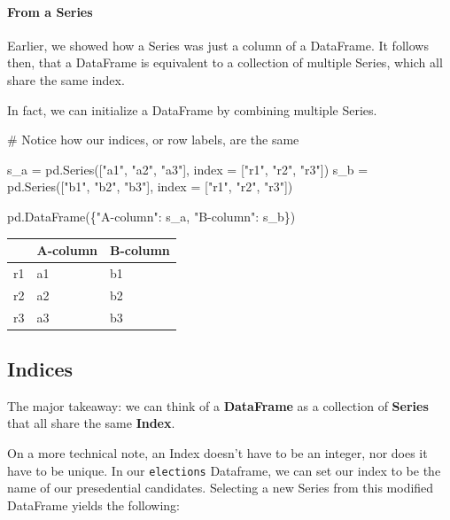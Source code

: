 \documentclass[
  letterpaper,
  DIV=11,
  numbers=noendperiod]{scrreprt}
\let\oldparagraph\paragraph
\renewcommand{\paragraph}[1]{\oldparagraph{#1}\mbox{}}
\newenvironment{Shaded}{\begin{snugshade}}{\end{snugshade}}
\newcommand{\CommentTok}[1]{\textcolor[rgb]{0.37,0.37,0.37}{#1}}
\newcommand{\NormalTok}[1]{\textcolor[rgb]{0.00,0.23,0.31}{#1}}
\newcommand{\OperatorTok}[1]{\textcolor[rgb]{0.37,0.37,0.37}{#1}}
\newcommand{\StringTok}[1]{\textcolor[rgb]{0.13,0.47,0.30}{#1}}
\begin{document}
\hypertarget{from-a-series}{%
\paragraph{From a Series}\label{from-a-series}}

Earlier, we showed how a Series was just a column of a DataFrame. It
follows then, that a DataFrame is equivalent to a collection of multiple
Series, which all share the same index.

In fact, we can initialize a DataFrame by combining multiple Series.

\begin{Shaded}
\begin{Highlighting}[]
\CommentTok{\# Notice how our indices, or row labels, are the same}

\NormalTok{s\_a }\OperatorTok{=}\NormalTok{ pd.Series([}\StringTok{"a1"}\NormalTok{, }\StringTok{"a2"}\NormalTok{, }\StringTok{"a3"}\NormalTok{], index }\OperatorTok{=}\NormalTok{ [}\StringTok{"r1"}\NormalTok{, }\StringTok{"r2"}\NormalTok{, }\StringTok{"r3"}\NormalTok{])}
\NormalTok{s\_b }\OperatorTok{=}\NormalTok{ pd.Series([}\StringTok{"b1"}\NormalTok{, }\StringTok{"b2"}\NormalTok{, }\StringTok{"b3"}\NormalTok{], index }\OperatorTok{=}\NormalTok{ [}\StringTok{"r1"}\NormalTok{, }\StringTok{"r2"}\NormalTok{, }\StringTok{"r3"}\NormalTok{])}

\NormalTok{pd.DataFrame(\{}\StringTok{"A{-}column"}\NormalTok{: s\_a, }\StringTok{"B{-}column"}\NormalTok{: s\_b\})}
\end{Highlighting}
\end{Shaded}

\begin{tabular}{lll}
\toprule
{} & A-column & B-column \\
\midrule
r1 &       a1 &       b1 \\
r2 &       a2 &       b2 \\
r3 &       a3 &       b3 \\
\bottomrule
\end{tabular}

\hypertarget{indices}{%
\subsection{Indices}\label{indices}}

The major takeaway: we can think of a \textbf{DataFrame} as a collection
of \textbf{Series} that all share the same \textbf{Index}.

On a more technical note, an Index doesn't have to be an integer, nor
does it have to be unique. In our \texttt{elections} Dataframe, we can
set our index to be the name of our presedential candidates. Selecting a
new Series from this modified DataFrame yields the following:
\end{document}
